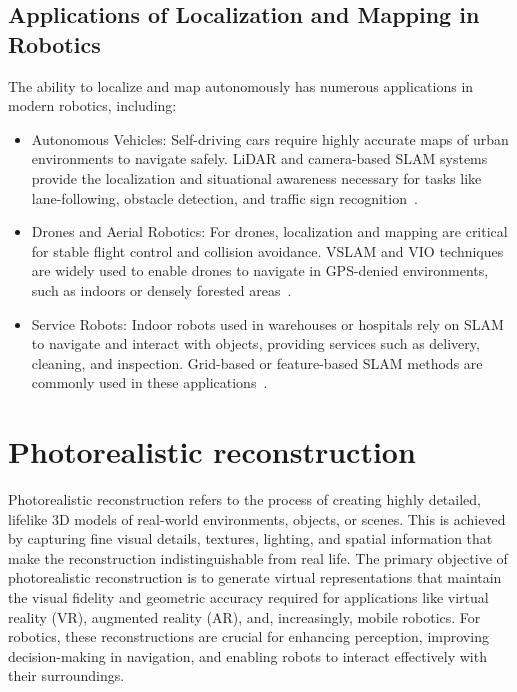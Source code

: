 \subsection{Applications of Localization and Mapping in Robotics}

The ability to localize and map autonomously has numerous applications in modern robotics, including:
\begin{itemize}
    \item Autonomous Vehicles: Self-driving cars require highly accurate maps of urban environments to navigate safely. LiDAR and camera-based SLAM systems provide the localization and situational awareness necessary for tasks like lane-following, obstacle detection, and traffic sign recognition~\cite{slam_for_autonomous_driving}.
    \item Drones and Aerial Robotics: For drones, localization and mapping are critical for stable flight control and collision avoidance. VSLAM and VIO techniques are widely used to enable drones to navigate in GPS-denied environments, such as indoors or densely forested areas~\cite{d2slam}.
    \item Service Robots: Indoor robots used in warehouses or hospitals rely on SLAM to navigate and interact with objects, providing services such as delivery, cleaning, and inspection. Grid-based or feature-based SLAM methods are commonly used in these applications~\cite{slam_for_service_robots}.
\end{itemize}

\section{Photorealistic reconstruction}

Photorealistic reconstruction refers to the process of creating highly detailed, lifelike 3D models of real-world environments, objects, or scenes. This is achieved by capturing fine visual details, textures, lighting, and spatial information that make the reconstruction indistinguishable from real life. The primary objective of photorealistic reconstruction is to generate virtual representations that maintain the visual fidelity and geometric accuracy required for applications like virtual reality (VR), augmented reality (AR), and, increasingly, mobile robotics. For robotics, these reconstructions are crucial for enhancing perception, improving decision-making in navigation, and enabling robots to interact effectively with their surroundings.

